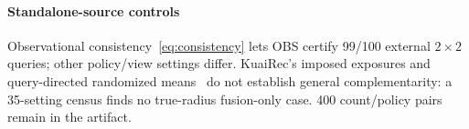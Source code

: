 \paragraph{Standalone-source controls}\label{sec:historical}
Observational consistency~\eqref{eq:consistency} lets OBS certify 99/100 external $2\times2$ queries; other policy/view settings differ. KuaiRec's imposed exposures and query-directed randomized means~\cite{gao2022kuairec} do not establish general complementarity: a 35-setting census finds no true-radius fusion-only case. 400 count/policy pairs remain in the artifact.
